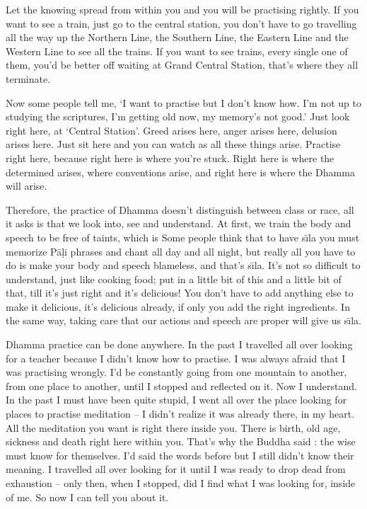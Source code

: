 Let the knowing spread from within you and you will be practising rightly. If you want to see a train, just go to the central station, you don't have to go travelling all the way up the Northern Line, the Southern Line, the Eastern Line and the Western Line to see all the trains. If you want to see trains, every single one of them, you'd be better off waiting at Grand Central Station, that's where they all terminate.

Now some people tell me, `I want to practise but I don't know how. I'm not up to studying the scriptures, I'm getting old now, my memory's not good.' Just look right here, at `Central Station'. Greed arises here, anger arises here, delusion arises here. Just sit here and you can watch as all these things arise. Practise right here, because right here is where you're stuck. Right here is where the determined arises, where conventions arise, and right here is where the Dhamma will arise.

Therefore, the practice of Dhamma doesn't distinguish between class or race, all it asks is that we look into, see and understand. At first, we train the body and speech to be free of taints, which is  Some people think that to have s\={\i}la you must memorize P\=a\d{l}i phrases and chant all day and all night, but really all you have to do is make your body and speech blameless, and that's s\={\i}la. It's not so difficult to understand, just like cooking food; put in a little bit of this and a little bit of that, till it's just right and it's delicious! You don't have to add anything else to make it delicious, it's delicious already, if only you add the right ingredients. In the same way, taking care that our actions and speech are proper will give us s\={\i}la.

Dhamma practice can be done anywhere. In the past I travelled all over looking for a teacher because I didn't know how to practise. I was always afraid that I was practising wrongly. I'd be constantly going from one mountain to another, from one place to another, until I stopped and reflected on it. Now I understand. In the past I must have been quite stupid, I went all over the place looking for places to practise meditation -- I didn't realize it was already there, in my heart. All the meditation you want is right there inside you. There is birth, old age, sickness and death right here within you. That's why the Buddha said : the wise must know for themselves. I'd said the words before but I still didn't know their meaning. I travelled all over looking for it until I was ready to drop dead from exhaustion -- only then, when I stopped, did I find what I was looking for, inside of me. So now I can tell you about it.

